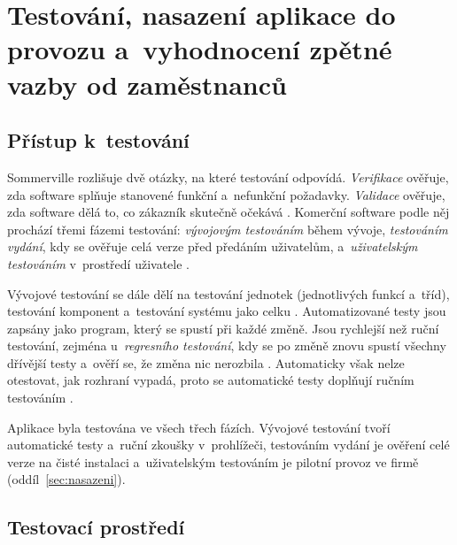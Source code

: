 \chapter{Testování, nasazení aplikace do provozu a~vyhodnocení zpětné vazby od zaměstnanců}\label{kap:testovani}

\section{Přístup k~testování}\label{sec:testovani-pristup}

Sommerville rozlišuje dvě otázky, na které testování odpovídá. \emph{Verifikace} ověřuje, zda software splňuje stanovené funkční a~nefunkční požadavky. \emph{Validace} ověřuje, zda software dělá to, co zákazník skutečně očekává \cite[s.~228]{Sommerville2016}. Komerční software podle něj prochází třemi fázemi testování: \emph{vývojovým testováním} během vývoje, \emph{testováním vydání}, kdy se ověřuje celá verze před předáním uživatelům, a~\emph{uživatelským testováním} v~prostředí uživatele \cite[s.~231]{Sommerville2016}.

Vývojové testování se dále dělí na testování jednotek (jednotlivých funkcí a~tříd), testování komponent a~testování systému jako celku \cite[s.~232]{Sommerville2016}. Automatizované testy jsou zapsány jako program, který se spustí při každé změně. Jsou rychlejší než ruční testování, zejména u~\emph{regresního testování}, kdy se po změně znovu spustí všechny dřívější testy a~ověří se, že změna nic nerozbila \cite[s.~231]{Sommerville2016}. Automaticky však nelze otestovat, jak rozhraní vypadá, proto se automatické testy doplňují ručním testováním \cite[s.~231]{Sommerville2016}.

Aplikace byla testována ve všech třech fázích. Vývojové testování tvoří automatické testy a~ruční zkoušky v~prohlížeči, testováním vydání je ověření celé verze na čisté instalaci a~uživatelským testováním je pilotní provoz ve firmě (oddíl~\ref{sec:nasazeni}).

\section{Testovací prostředí}\label{sec:testovani-prostredi}

